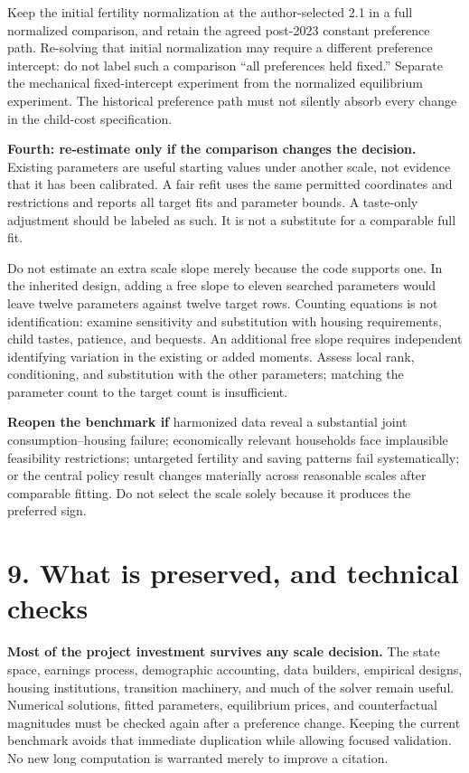 \documentclass[11pt,letterpaper]{article}
\newcommand{\page}[1]{\newpage\section*{#1}}
\begin{document}
Keep the initial fertility normalization at the author-selected 2.1 in a full normalized comparison, and retain the agreed post-2023 constant preference path. Re-solving that initial normalization may require a different preference intercept: do not label such a comparison ``all preferences held fixed.'' Separate the mechanical fixed-intercept experiment from the normalized equilibrium experiment. The historical preference path must not silently absorb every change in the child-cost specification.

\textbf{Fourth: re-estimate only if the comparison changes the decision.} Existing parameters are useful starting values under another scale, not evidence that it has been calibrated. A fair refit uses the same permitted coordinates and restrictions and reports all target fits and parameter bounds. A taste-only adjustment should be labeled as such. It is not a substitute for a comparable full fit.

Do not estimate an extra scale slope merely because the code supports one. In the inherited design, adding a free slope to eleven searched parameters would leave twelve parameters against twelve target rows. Counting equations is not identification: examine sensitivity and substitution with housing requirements, child tastes, patience, and bequests. An additional free slope requires independent identifying variation in the existing or added moments. Assess local rank, conditioning, and substitution with the other parameters; matching the parameter count to the target count is insufficient.

\textbf{Reopen the benchmark if} harmonized data reveal a substantial joint consumption--housing failure; economically relevant households face implausible feasibility restrictions; untargeted fertility and saving patterns fail systematically; or the central policy result changes materially across reasonable scales after comparable fitting. Do not select the scale solely because it produces the preferred sign.

\page{9. What is preserved, and technical checks}
\textbf{Most of the project investment survives any scale decision.} The state space, earnings process, demographic accounting, data builders, empirical designs, housing institutions, transition machinery, and much of the solver remain useful. Numerical solutions, fitted parameters, equilibrium prices, and counterfactual magnitudes must be checked again after a preference change. Keeping the current benchmark avoids that immediate duplication while allowing focused validation. No new long computation is warranted merely to improve a citation.
\end{document}
